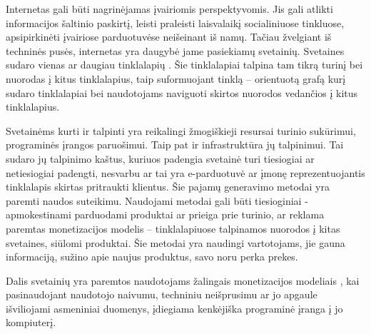 
Internetas gali būti nagrinėjamas įvairiomis perspektyvomis. Jis gali atlikti informacijos šaltinio paskirtį, leisti praleisti laisvalaikį socialiniuose tinkluose, apsipirkinėti įvairiose parduotuvėse neišeinant iš namų.  Tačiau žvelgiant iš techninės pusės, internetas yra daugybė jame pasiekiamų svetainių. Svetaines sudaro vienas ar daugiau tinklalapių . Šie tinklalapiai talpina tam tikrą turinį bei nuorodas į kitus tinklalapius, taip suformuojant tinklą -- orientuotą grafą kurį sudaro tinklalapiai bei naudotojams naviguoti skirtos nuorodos vedančios į kitus tinklalapius.

Svetainėms kurti ir talpinti yra reikalingi žmogiškieji resursai turinio sukūrimui, programinės įrangos paruošimui. Taip pat ir infrastruktūra jų talpinimui. Tai sudaro jų talpinimo kaštus, kuriuos padengia svetainė turi tiesiogiai ar netiesiogiai padengti, nesvarbu ar tai yra e-parduotuvė ar įmonę reprezentuojantis tinklalapis skirtas pritraukti klientus. Šie pajamų generavimo metodai yra paremti naudos suteikimu. Naudojami metodai gali būti tiesioginiai - apmokestinami parduodami produktai ar prieiga prie turinio, ar reklama paremtas monetizacijos modelis -- tinklalapiuose talpinamos nuorodos į kitas svetaines, siūlomi produktai. Šie metodai yra naudingi vartotojams, jie gauna informaciją, sužino apie naujus produktus, savo noru perka prekes.

Dalis svetainių yra paremtos naudotojams žalingais monetizacijos modeliais \cite{tax}, kai pasinaudojant naudotojo naivumu, techniniu neišprusimu ar jo apgaule išviliojami asmeniniai duomenys, įdiegiama kenkėjiška programinė įranga į jo kompiuterį.